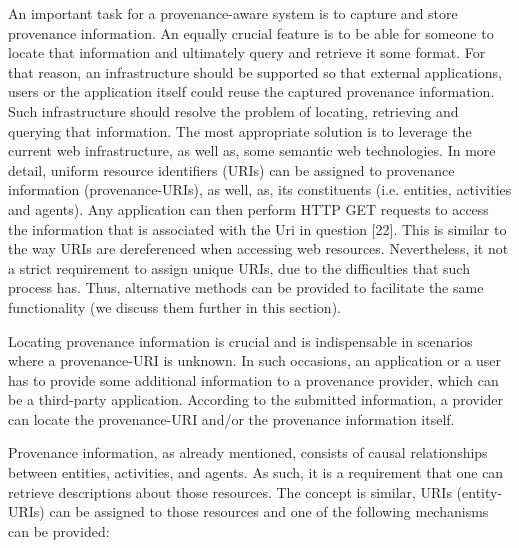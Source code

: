 An important task for a provenance-aware system is to capture and store provenance information. An equally crucial feature is to be able for someone to locate that information and ultimately query and retrieve it some format.  For that reason, an infrastructure should be supported so that external applications, users or the application itself could reuse the captured provenance information. Such infrastructure should resolve the problem of locating, retrieving and querying that information. The most appropriate solution is to leverage the current web infrastructure, as well as, some semantic web technologies. In more detail, uniform resource identifiers (URIs) can be assigned to provenance information (provenance-URIs), as well, as, its constituents (i.e. entities, activities and agents). Any application can then perform HTTP GET requests to access the information that is associated with the Uri in question [22]. This is similar to the way URIs are dereferenced when accessing web resources. Nevertheless, it not a strict requirement to assign unique URIs, due to the difficulties that such process has. Thus, alternative methods can be provided to facilitate the same functionality (we discuss them further in this section).

Locating provenance information is crucial and is indispensable in scenarios where a provenance-URI is unknown. In such occasions, an application or a user has to provide some additional information to a provenance provider, which can be a third-party application. According to the submitted information, a provider can locate the provenance-URI and/or the provenance information itself.

Provenance information, as already mentioned, consists of causal relationships between entities, activities, and agents. As such, it is a requirement that one can retrieve descriptions about those resources. The concept is similar, URIs (entity-URIs) can be assigned to those resources and one of the following mechanisms can be provided:

